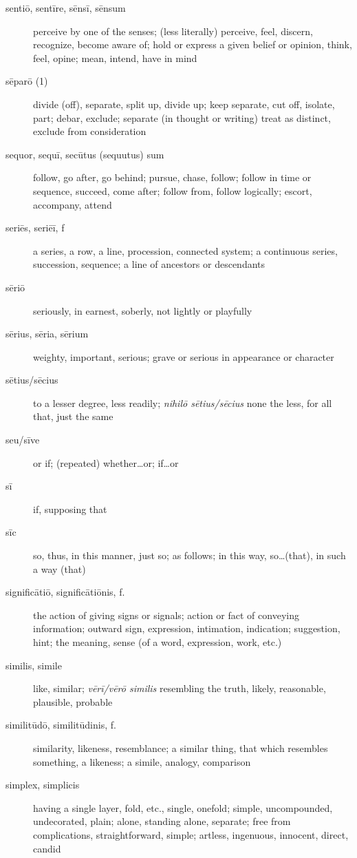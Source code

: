 \begin{description}
    \item[sentiō, sentīre, sēnsī, sēnsum] \marginnote{*}perceive by one of the senses; (less literally) perceive, feel, discern, recognize, become aware of; hold or express a given belief or opinion, think, feel, opine; mean, intend, have in mind
    \item[sēparō (1)] divide (off), separate, split up, divide up; keep separate, cut off, isolate, part; debar, exclude; separate (in thought or writing) treat as distinct, exclude from consideration
    \item[sequor, sequī, secūtus (sequutus) sum] \marginnote{*}follow, go after, go behind; pursue, chase, follow; follow in time or sequence, succeed, come after; follow from, follow logically; escort, accompany, attend
    \item[seriēs, seriēī, f] a series, a row, a line, procession, connected system; a continuous series, succession, sequence; a line of ancestors or descendants
    \item[sēriō] seriously, in earnest, soberly, not lightly or playfully
    \item[sērius, sēria, sērium] weighty, important, serious; grave or serious in appearance or character
    \item[sētius/sēcius] to a lesser degree, less readily; \textit{nihilō sētius/sēcius} none the less, for all that, just the same
    \item[seu/sīve] \marginnote{*}or if; (repeated) whether\dots or; if\dots or
    \item[sī] \marginnote{*}if, supposing that
    \item[sīc] \marginnote{*}so, thus, in this manner, just so; as follows; in this way, so\dots (that), in such a way (that)
    \item[significātiō, significātiōnis, f.] the action of giving signs or signals; action or fact of conveying information; outward sign, expression, intimation, indication; suggestion, hint; the meaning, sense (of a word, expression, work, etc.)
    \item[similis, simile] \marginnote{*}like, similar; \textit{vērī/vērō similis} resembling the truth, likely, reasonable, plausible, probable
    \item[similitūdō, similitūdinis, f.] similarity, likeness, resemblance; a similar thing, that which resembles something, a likeness; a simile, analogy, comparison
    \item[simplex, simplicis] having a single layer, fold, etc., single, onefold; simple, uncompounded, undecorated, plain; alone, standing alone, separate; free from complications, straightforward, simple; artless, ingenuous, innocent, direct, candid

\end{description}
